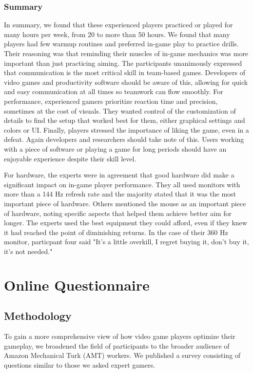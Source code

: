 \documentclass[11pt,manuscript,screen,review]{acmart} %
\begin{document}
\subsubsection{Summary}

In summary, we found that these experienced players practiced or played for many hours per week, from 20 to more than 50 hours. We found that many players had few warmup routines and preferred in-game play to practice drills. Their reasoning was that reminding their muscles of in-game mechanics was more important than just practicing aiming. The participants unanimously expressed that communication is the most critical skill in team-based games. Developers of video games and productivity software should be aware of this, allowing for quick and easy communication at all times so teamwork can flow smoothly. For performance, experienced gamers prioritize reaction time and precision, sometimes at the cost of visuals. They wanted control of the customization of details to find the setup that worked best for them, either graphical settings and colors or UI. Finally, players stressed the importance of liking the game, even in a defeat. Again developers and researchers should take note of this. Users working with a piece of software or playing a game for long periods should have an enjoyable experience despite their skill level. 

For hardware, the experts were in agreement that good hardware did make a significant impact on in-game player performance. They all used monitors with more than a 144 Hz refresh rate and the majority stated that it was the most important piece of hardware. Others mentioned the mouse as an important piece of hardware, noting specific aspects that helped them achieve better aim for longer. The experts used the best equipment they could afford, even if they knew it had reached the point of diminishing returns. In the case of their 360 Hz monitor, particpant four said "It's a little overkill, I regret buying it, don't buy it, it's not needed."  

\section{Online Questionnaire}

\subsection{Methodology}
To gain a more comprehensive view of how video game players optimize their gameplay, we broadened the field of participants to the broader audience of Amazon Mechanical Turk (AMT) workers. We published a survey consisting of questions similar to those we asked expert gamers. 
\end{document}
